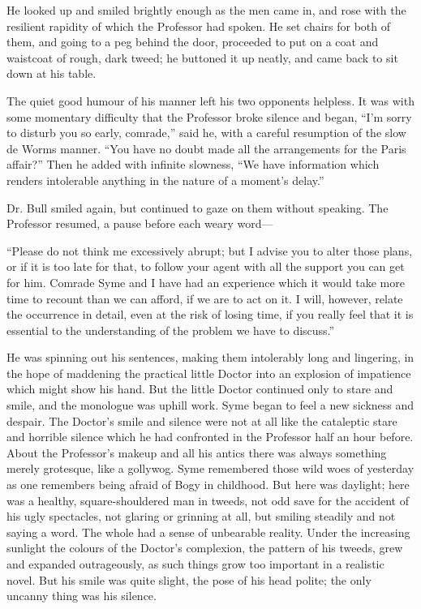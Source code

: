 He looked up and smiled brightly enough as the men came in, and rose with the resilient rapidity of which the Professor had spoken. He set chairs for both of them, and going to a peg behind the door, proceeded to put on a coat and waistcoat of rough, dark tweed; he buttoned it up neatly, and came back to sit down at his table.

The quiet good humour of his manner left his two opponents helpless. It was with some momentary difficulty that the Professor broke silence and began, “I’m sorry to disturb you so early, comrade,” said he, with a careful resumption of the slow de Worms manner. “You have no doubt made all the arrangements for the Paris affair?” Then he added with infinite slowness, “We have information which renders intolerable anything in the nature of a moment’s delay.”

Dr. Bull smiled again, but continued to gaze on them without speaking. The Professor resumed, a pause before each weary word⁠—

“Please do not think me excessively abrupt; but I advise you to alter those plans, or if it is too late for that, to follow your agent with all the support you can get for him. Comrade Syme and I have had an experience which it would take more time to recount than we can afford, if we are to act on it. I will, however, relate the occurrence in detail, even at the risk of losing time, if you really feel that it is essential to the understanding of the problem we have to discuss.”

He was spinning out his sentences, making them intolerably long and lingering, in the hope of maddening the practical little Doctor into an explosion of impatience which might show his hand. But the little Doctor continued only to stare and smile, and the monologue was uphill work. Syme began to feel a new sickness and despair. The Doctor’s smile and silence were not at all like the cataleptic stare and horrible silence which he had confronted in the Professor half an hour before. About the Professor’s makeup and all his antics there was always something merely grotesque, like a gollywog. Syme remembered those wild woes of yesterday as one remembers being afraid of Bogy in childhood. But here was daylight; here was a healthy, square-shouldered man in tweeds, not odd save for the accident of his ugly spectacles, not glaring or grinning at all, but smiling steadily and not saying a word. The whole had a sense of unbearable reality. Under the increasing sunlight the colours of the Doctor’s complexion, the pattern of his tweeds, grew and expanded outrageously, as such things grow too important in a realistic novel. But his smile was quite slight, the pose of his head polite; the only uncanny thing was his silence.

